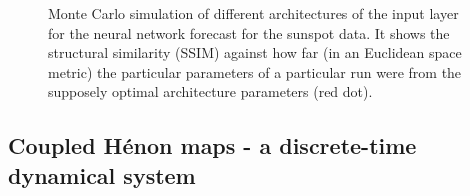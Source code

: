 \documentclass[journal]{IEEEtran}
\begin{document}
\begin{figure}[!ht]
\centering
{}
\caption{Monte Carlo simulation of different architectures of the input layer for the neural network forecast for the sunspot data.
It shows the structural similarity (SSIM) against how far (in an Euclidean space metric) the particular parameters of a particular
run were from the supposely optimal architecture parameters (red dot).}
\label{MonteCarloSSIMversusParameterMetricDistance}
\end{figure}


%
%


\subsection{Coupled H\'{e}non maps - a discrete-time dynamical system}

\end{document}
